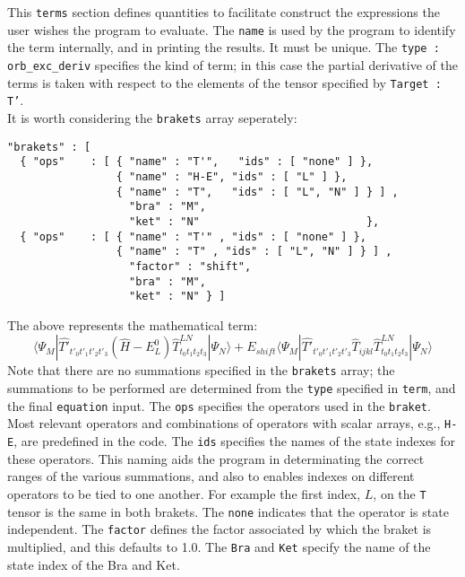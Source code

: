 This \texttt{terms} section defines quantities to facilitate construct the expressions
the user wishes the program to evaluate.  The \texttt{name} is used by the program to
identify the term internally, and in printing the results. It must be unique. 
The \texttt{type : orb\_exc\_deriv} specifies the kind of term;  in this case the partial
derivative of the terms is taken with respect to the elements of the tensor specified by \texttt{Target : T'}.\\

\noindent It is worth considering the \texttt{brakets} array seperately:

\begin{lstlisting}[label={lst:brakets}]
"brakets" : [
  { "ops"    : [ { "name" : "T'",   "ids" : [ "none" ] },
                 { "name" : "H-E", "ids" : [ "L" ] },
                 { "name" : "T",   "ids" : [ "L", "N" ] } ] ,
                   "bra" : "M",
                   "ket" : "N"                          }, 
  { "ops"    : [ { "name" : "T'" , "ids" : [ "none" ] },
                 { "name" : "T" , "ids" : [ "L", "N" ] } ] ,
                   "factor" : "shift",
                   "bra" : "M",
                   "ket" : "N" } ] 
\end{lstlisting}         
The above represents the mathematical term:
\begin{equation}
\langle \Psi_{M} |  \hat{T'}_{t'_{0}t'_{1}t'_{2}t'_{3}}
 ( \hat{H}-E^{0}_{L} ) \hat{T}^{LN}_{ t_{0}t_{1}t_{2}t_{3} } | \Psi_{N} \rangle + 
E_{shift}\langle \Psi_{M} | \hat{T'}_{t'_{0}t'_{1}t'_{2}t'_{3}}\hat{T}_{ijkl}  \hat{T}^{LN}_{ t_{0}t_{1}t_{2}t_{3} }| \Psi_{N} \rangle 
\end{equation}
\noindent Note that there are no summations specified in the \texttt{brakets} array; the summations to
be performed are determined from the \texttt{type} specified in \texttt{term}, and the final
\texttt{equation} input.
The \texttt{ops} specifies the operators used in the \texttt{braket}. Most relevant operators and combinations of
operators with scalar arrays, e.g., \texttt{H-E}, are predefined in the code. The \texttt{ids}
specifies the names of the state indexes for these operators. 
This naming aids the program in determinating the correct ranges of the various summations, and also to enables
indexes on different operators to be tied to one another. For example the first index, $L$, on the \texttt{T}
tensor is the same in both brakets. The \texttt{none} indicates that the operator is state independent.
The \texttt{factor} defines the factor associated by which the braket is multiplied, and this
defaults to 1.0. The \texttt{Bra} and \texttt{Ket} specify the name of the state index of the Bra and Ket. \\

